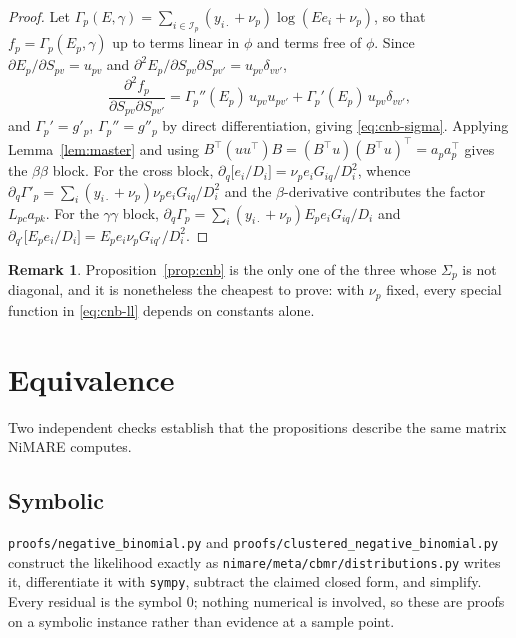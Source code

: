 \documentclass[11pt,a4paper]{article}
\theoremstyle{plain}
\theoremstyle{definition}
\newtheorem{remark}[proposition]{Remark}
\newcommand{\E}{\mathcal{I}}
\begin{document}
\begin{proof}
Let $\Gamma_p(E,\gamma) = \sum_{i\in\E_p}(y_{i\cdot}+\nu_p)\log(Ee_i+\nu_p)$, so that
$f_p = \Gamma_p(E_p, \gamma)$ up to terms linear in $\phi$ and terms free of $\phi$. Since
$\partial E_p/\partial S_{pv} = u_{pv}$ and
$\partial^2 E_p/\partial S_{pv}\partial S_{pv'} = u_{pv}\delta_{vv'}$,
\[
  \frac{\partial^2 f_p}{\partial S_{pv}\partial S_{pv'}}
   = \Gamma_p''(E_p)\,u_{pv}u_{pv'} + \Gamma_p'(E_p)\,u_{pv}\delta_{vv'} ,
\]
and $\Gamma_p' = g'_p$, $\Gamma_p'' = g''_p$ by direct differentiation, giving
\eqref{eq:cnb-sigma}. Applying Lemma~\ref{lem:master} and using
$B^\top(u u^\top)B = (B^\top u)(B^\top u)^\top = a_pa_p^\top$ gives the $\beta\beta$ block. For
the cross block, $\partial_q \bigl[e_i/D_i\bigr] = \nu_p e_i G_{iq}/D_i^2$, whence
$\partial_q \Gamma'_p = \sum_i (y_{i\cdot}+\nu_p)\nu_pe_iG_{iq}/D_i^2$ and the
$\beta$-derivative contributes the factor $L_{pc}a_{pk}$. For the $\gamma\gamma$ block,
$\partial_q \Gamma_p = \sum_i (y_{i\cdot}+\nu_p)E_pe_iG_{iq}/D_i$ and
$\partial_{q'}\bigl[E_pe_i/D_i\bigr] = E_pe_i\nu_pG_{iq'}/D_i^2$.
\end{proof}

\begin{remark}
Proposition~\ref{prop:cnb} is the only one of the three whose $\Sigma_p$ is not diagonal, and it
is nonetheless the cheapest to prove: with $\nu_p$ fixed, every special function in
\eqref{eq:cnb-ll} depends on constants alone.
\end{remark}

\section{Equivalence}

Two independent checks establish that the propositions describe the same matrix NiMARE computes.

\subsection{Symbolic}

\texttt{proofs/negative\_binomial.py} and \texttt{proofs/clustered\_negative\_binomial.py}
construct the likelihood exactly as \texttt{nimare/meta/cbmr/distributions.py} writes it,
differentiate it with \texttt{sympy}, subtract the claimed closed form, and simplify. Every
residual is the symbol $0$; nothing numerical is involved, so these are proofs on a symbolic
instance rather than evidence at a sample point.
\end{document}
